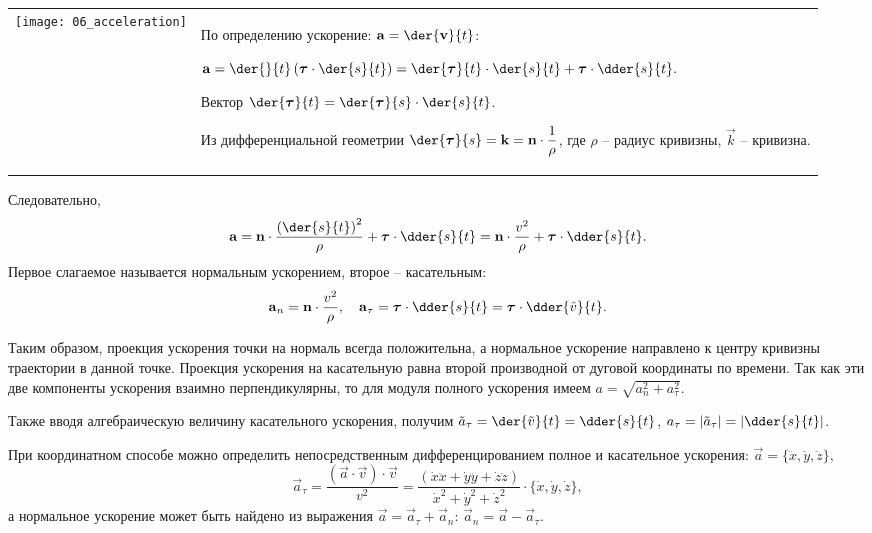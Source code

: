\begin{table}[h!]
    \begin{tabular}{C{.4}m{.55\textwidth}}
        \texttt{[image: 06\_acceleration]} &
        По определению ускорение: \( \ds \vec{a} = \der{\vec{v}}{t} \):
        
        \( \ds \vec{a} = \der{}{t}\left(\vec{\tau}\cdot\der{s}{t}\right) =
        \der{\vec{\tau}}{t}\cdot\der{s}{t} + \vec{\tau}\cdot\dder{s}{t}. \)
        
        Вектор \( \ds \der{\vec{\tau}}{t} = \der{\vec{\tau}}{s}\cdot\der{s}{t} \).
        
        Из дифференциальной геометрии \( \ds \der{\vec{\tau}}{s} = \vec{k} =
        \vec{n}\cdot\frac{1}{\rho} \), где \( \rho \) -- радиус кривизны,
        \( \vec{k} \) -- кривизна. 
    \end{tabular}
\end{table}

Следовательно,
\[
    \vec{a} = \vec{n}\cdot\frac{\left(\der{s}{t}\right)^2}{\rho} + \vec{\tau}
    \cdot\dder{s}{t} = \vec{n}\cdot\frac{v^2}{\rho}+ \vec{\tau}\cdot\dder{s}{t}.
\]
Первое слагаемое называется нормальным ускорением, второе -- касательным:
\[
    \vec{a}_n = \vec{n}\cdot\frac{v^2}{\rho}, \quad \vec{a}_\tau =
    \vec{\tau}\cdot\dder{s}{t} = \vec{\tau}\cdot\dder{\tilde{v}}{t}.
\]

Таким образом, проекция ускорения точки на нормаль всегда положительна, а
нормальное ускорение направлено к центру кривизны траектории в данной точке.
Проекция ускорения на касательную равна второй производной от дуговой координаты
по времени. Так как эти две компоненты ускорения взаимно перпендикулярны, то для
модуля полного ускорения имеем \( a = \sqrt{a_n^2 + a_\tau^2} \).

Также вводя алгебраическую величину касательного ускорения, получим
\( \ds \tilde{a}_\tau = \der{\tilde{v}}{t} = \dder{s}{t} \),
\( \ds a_\tau = |\tilde{a}_\tau| = \left|\dder{s}{t}\right| \).

При координатном способе можно определить непосредственным дифференцированием
полное и касательное ускорения: \( \vec{a} = \bigl\{ \ddot{x}, \ddot{y},
\ddot{z}\bigr\} \),
\[
    \vec{a}_\tau = \frac{(\vec{a}\cdot\vec{v})\cdot\vec{v}}{v^2} = \frac{(
    \dot{x}\ddot{x} + \dot{y}\ddot{y} + \dot{z}\ddot{z})}{\dot{x}^2 + \dot{y}^2
    + \dot{z}^2}\cdot\bigl\{\dot{x}, \dot{y}, \dot{z}\bigr\},
\]
а нормальное ускорение может быть найдено из выражения \( \vec{a} = \vec{a}_\tau
+ \vec{a}_n \): \( \vec{a}_n = \vec{a} - \vec{a}_\tau \).

\newpage
